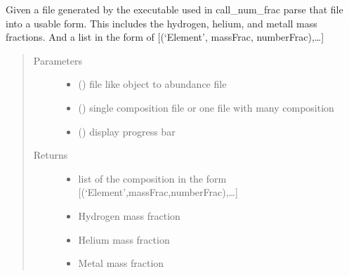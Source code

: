 \documentclass[letterpaper,10pt,english]{sphinxmanual}
\begin{document}
\begin{fulllineitems}
\label{\detokenize{pyTOPSScrape.ext:pyTOPSScrape.ext.utils.parse_numfrac_file}}
\sphinxAtStartPar
Given a file generated by the executable used in call\_num\_frac parse that
file into a usable form. This includes the hydrogen, helium, and
metall mass fractions. And a list in the form of
{[}(‘Element’, massFrac, numberFrac),…{]}
\begin{quote}\begin{description}
\item[{Parameters}] \leavevmode\begin{itemize}
\item {} 
\sphinxAtStartPar
{} () \textendash{} file like object to abundance file

\item {} 
\sphinxAtStartPar
{} () \textendash{} single composition file or one file with many composition

\item {} 
\sphinxAtStartPar
{} () \textendash{} display progress bar

\end{itemize}

\item[{Returns}] \leavevmode
\sphinxAtStartPar
\begin{itemize}
\item {} 
\sphinxAtStartPar
{} \textendash{} list of the composition in the form {[}(‘Element’,massFrac,numberFrac),…{]}

\item {} 
\sphinxAtStartPar
{} \textendash{} Hydrogen mass fraction

\item {} 
\sphinxAtStartPar
{} \textendash{} Helium mass fraction

\item {} 
\sphinxAtStartPar
{} \textendash{} Metal mass fraction

\end{itemize}


\end{description}\end{quote}

\end{fulllineitems}
\end{document}
